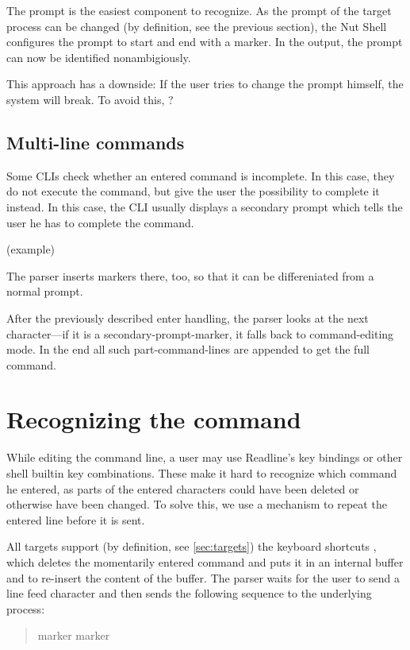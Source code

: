 \documentclass[paper=a4,twoside,abstract=on,cleardoublepage=empty,numbers=noenddot,toc=bib,11pt,appendixprefix=true]{scrreprt}
\begin{document}
The prompt is the easiest component to recognize. As the prompt of the target process can be changed (by definition, see the previous section), the Nut Shell configures the prompt to start and end with a marker. In the output, the prompt can now be identified nonambigiously.

This approach has a downside: If the user tries to change the prompt himself, the system will break. To avoid this, ?

\subsection*{Multi-line commands}

Some \textsc{CLI}s check whether an entered command is incomplete. In this case, they do not execute the command, but give the user the possibility to complete it instead. In this case, the CLI usually displays a secondary prompt which tells the user he has to complete the command.

(example)

The parser inserts markers there, too, so that it can be differeniated from a normal prompt.

After the previously described enter handling, the parser looks at the next character---if it is a secondary-prompt-marker, it falls back to command-editing mode. In the end all such part-command-lines are appended to get the full command.

\section{Recognizing the command}

While editing the command line, a user may use Readline's key bindings or other shell builtin key combinations. These make it hard to recognize which command he entered, as parts of the entered characters could have been deleted or otherwise have been changed. To solve this, we use a mechanism to repeat the entered line before it is sent.

All targets support (by definition, see \cref{sec:targets}) the keyboard shortcuts , which deletes the momentarily entered command and puts it in an internal buffer and  to re-insert the content of the buffer. The parser waits for the user to send a line feed character and then sends the following sequence to the underlying process:

\begin{quote}
     marker   marker  \keys{\return}
\end{quote}
\end{document}
